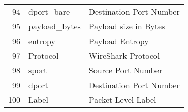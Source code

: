 \documentclass{article}
\begin{document}
\begin{table}[htbp]
{\begin{tabular}{rll}
				94    & dport\_bare & Destination Port Number \\
				\rowcolor[rgb]{ .851,  .851,  .851} 95    & payload\_bytes & Payload size in Bytes \\
				96    & entropy & Payload Entropy \\
				\rowcolor[rgb]{ .851,  .851,  .851} 97    & Protocol & WireShark Protocol \\
				98    & sport & Source Port Number \\
				\rowcolor[rgb]{ .851,  .851,  .851} 99    & dport & Destination Port Number \\
				100   & Label & Packet Level Label \\
				\bottomrule
		\end{tabular}}%
		\label{tab:addlabel}%
	\end{table}%
	
	

	
\end{document}
